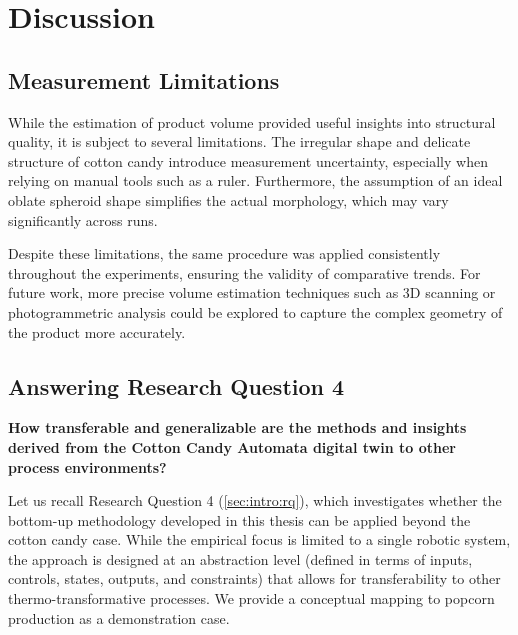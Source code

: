 \chapter{Discussion}
\label{sec:discussion}

\section{Measurement Limitations}

While the estimation of product volume provided useful insights into structural quality, it is subject to several limitations. The irregular shape and delicate structure of cotton candy introduce measurement uncertainty, especially when relying on manual tools such as a ruler. Furthermore, the assumption of an ideal oblate spheroid shape simplifies the actual morphology, which may vary significantly across runs.

Despite these limitations, the same procedure was applied consistently throughout the experiments, ensuring the validity of comparative trends. For future work, more precise volume estimation techniques such as 3D scanning or photogrammetric analysis could be explored to capture the complex geometry of the product more accurately.

\section*{Answering Research Question 4}
\textbf{How transferable and generalizable are the methods and insights derived from the Cotton Candy Automata digital twin to other process environments?}

Let us recall Research Question 4 (\ref{sec:intro:rq}), which investigates whether the bottom-up methodology developed in this thesis can be applied beyond the cotton candy case. While the empirical focus is limited to a single robotic system, the approach is designed at an abstraction level (defined in terms of inputs, controls, states, outputs, and constraints) that allows for transferability to other thermo-transformative processes. We provide a conceptual mapping to popcorn production as a demonstration case.

